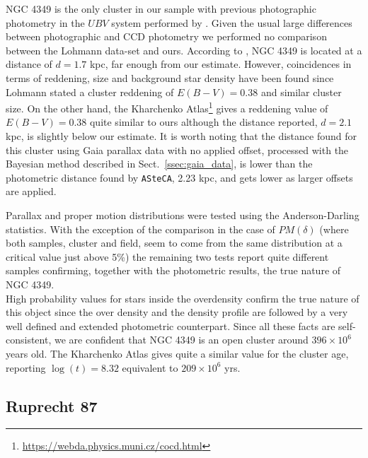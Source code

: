 \documentclass[draft]{aa}
\begin{document}
NGC 4349 is the only cluster in our sample with previous photographic photometry
in the $UBV$ system performed by \cite{Lohmann_1961}. Given the usual large
differences between photographic and CCD photometry we performed no comparison
between the Lohmann data-set and ours. According to \cite{Lohmann_1961}, NGC
4349 is located at a distance of $d=1.7$ kpc, far enough from our estimate.
However, coincidences in terms of reddening, size and background star density
have been found since Lohmann stated a cluster reddening of $E(B-V)=0.38$
and similar cluster size. On the other hand, the Kharchenko
Atlas\footnote{\url{https://webda.physics.muni.cz/cocd.html}}
\citep{Kharchenko_2005} gives a reddening value of $E(B-V) = 0.38$ quite
similar to ours although the distance reported, $d=2.1$ kpc, is slightly below
our estimate.
It is worth noting that the distance found for this cluster using Gaia
parallax data with no applied offset, processed with the Bayesian method
described in Sect.~\ref{ssec:gaia_data}, is lower than the photometric
distance found by \texttt{ASteCA}, 2.23 kpc, and gets lower as larger offsets
are applied.

Parallax and proper motion distributions were tested using the Anderson-Darling
statistics. With the exception of the comparison in the case of $PM(\delta)$
(where both samples, cluster and field, seem to come from the same distribution
at a critical value just above 5\%) the remaining two tests report quite
different samples confirming, together with the photometric results, the true
nature of NGC 4349.\\

High probability values for stars inside the overdensity confirm the
true nature of this object since the over density and the density profile
are followed by a very well defined and extended photometric counterpart.
Since all these facts are self-consistent, we are confident that NGC 4349 is
an open cluster around $396\times10^6$ years old.
The Kharchenko Atlas gives quite a similar value for the cluster age, reporting
$\log(t)=8.32$ equivalent to $209\times10^6$ yrs.



\subsection{Ruprecht 87}
\end{document}

